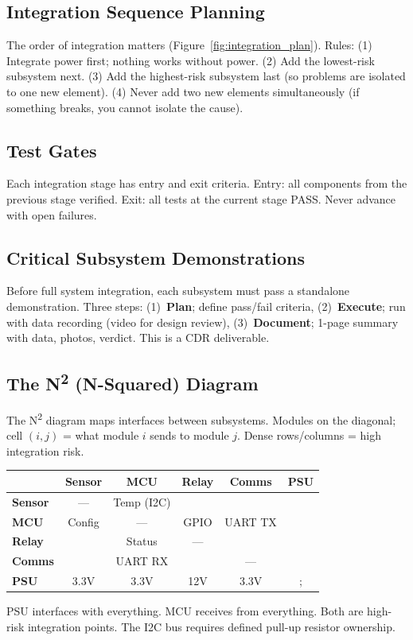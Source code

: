 \subsection{Integration Sequence Planning}



The order of integration matters (Figure~\ref{fig:integration_plan}). Rules: (1) Integrate power first; nothing works without power. (2) Add the lowest-risk subsystem next. (3) Add the highest-risk subsystem last (so problems are isolated to one new element). (4) Never add two new elements simultaneously (if something breaks, you cannot isolate the cause).

\subsection{Test Gates}
Each integration stage has entry and exit criteria. Entry: all components from the previous stage verified. Exit: all tests at the current stage PASS. Never advance with open failures.


\subsection{Critical Subsystem Demonstrations}
Before full system integration, each subsystem must pass a standalone demonstration. Three steps: (1)~\textbf{Plan}; define pass/fail criteria, (2)~\textbf{Execute}; run with data recording (video for design review), (3)~\textbf{Document}; 1-page summary with data, photos, verdict. This is a CDR deliverable.

\subsection{The N\texorpdfstring{\textsuperscript{2}}{2} (N-Squared) Diagram}
The N\textsuperscript{2} diagram maps interfaces between subsystems. Modules on the diagonal; cell $(i,j)$ = what module $i$ sends to module $j$. Dense rows/columns = high integration risk.

\begin{greenshieldbox}
\small
\begin{tabularx}{\linewidth}{l|c|c|c|c|c}
 & \textbf{Sensor} & \textbf{MCU} & \textbf{Relay} & \textbf{Comms} & \textbf{PSU} \\
\hline
\textbf{Sensor} & --- & Temp (I2C) & & & \\
\hline
\textbf{MCU} & Config & --- & GPIO & UART TX & \\
\hline
\textbf{Relay} & & Status & --- & & \\
\hline
\textbf{Comms} & & UART RX & & --- & \\
\hline
\textbf{PSU} & 3.3V & 3.3V & 12V & 3.3V &; \\
\end{tabularx}

PSU interfaces with everything. MCU receives from everything. Both are high-risk integration points. The I2C bus requires defined pull-up resistor ownership.
\end{greenshieldbox}

